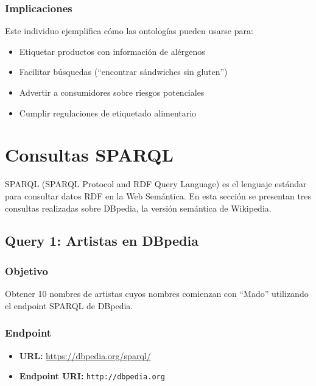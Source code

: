 \documentclass[12pt,a4paper]{article}
\begin{document}
\subsubsection{Implicaciones}

Este individuo ejemplifica cómo las ontologías pueden usarse para:
\begin{itemize}
    \item Etiquetar productos con información de alérgenos
    \item Facilitar búsquedas (``encontrar sándwiches sin gluten'')
    \item Advertir a consumidores sobre riesgos potenciales
    \item Cumplir regulaciones de etiquetado alimentario
\end{itemize}

\section{Consultas SPARQL}

SPARQL (SPARQL Protocol and RDF Query Language) es el lenguaje estándar para consultar datos RDF en la Web Semántica. En esta sección se presentan tres consultas realizadas sobre DBpedia, la versión semántica de Wikipedia.

\subsection{Query 1: Artistas en DBpedia}

\subsubsection{Objetivo}

Obtener 10 nombres de artistas cuyos nombres comienzan con ``Mado'' utilizando el endpoint SPARQL de DBpedia.

\subsubsection{Endpoint}

\begin{itemize}
    \item \textbf{URL:} \url{https://dbpedia.org/sparql/}
    \item \textbf{Endpoint URI:} \texttt{http://dbpedia.org}
\end{itemize}
\end{document}
